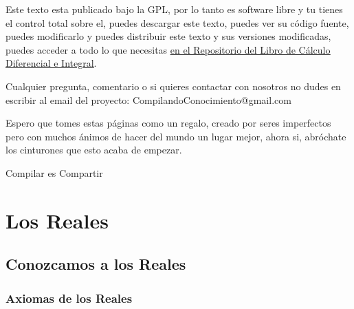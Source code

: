 \documentclass[12pt, fleqn]{report}                             %
\theoremstyle{break}                                            %
\begin{document}
    Este texto esta publicado bajo la GPL, por lo tanto es software libre y tu tienes el control total sobre
    el, puedes descargar este texto, puedes ver su código fuente, puedes modificarlo y puedes distribuir este
    texto y sus versiones modificadas, puedes acceder a todo lo que necesitas 
    \href{http://www.github.com/CompilandoConocimiento/LibroCalculoDiferencialEIntegral}
    {\underline{en el Repositorio del Libro de Cálculo Diferencial e Integral}}. 

    Cualquier pregunta, comentario o si quieres contactar con nosotros no dudes en escribir al email del proyecto:
    CompilandoConocimiento@gmail.com

    Espero que tomes estas páginas como un regalo, creado por seres imperfectos pero con muchos ánimos de hacer
    del mundo un lugar mejor, ahora si, abróchate los cinturones que esto acaba de empezar.

    \begin{flushright}
        Compilar es Compartir
    \end{flushright}




\part{Los Reales}

    \chapter{Conozcamos a los Reales}
        \clearpage

        \section{Axiomas de los Reales}
\end{document}
